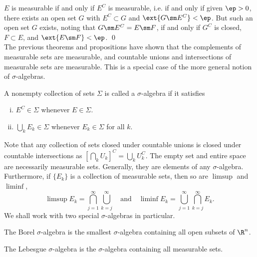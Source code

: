 \pf $E$ is measurable if and only if $E^C$ is measurable, i.e. if and only if given $\ep>0$, there exists an open set $G$ with $E^C \subset G$ and $\ext{G \sm E^C}<\ep$. But such an open set $G$ exists, noting that $G \sm E^C=E \sm F$, if and only if $G^C$ is closed, $F \subset E$, and $\ext{E \sm F}<\ep$. \qed \\










The previous theorems and propositions have shown that the complements of measurable sets are measurable, and countable unions and intersections of measurable sets are measurable. This is a special case of the more general notion of $\sigma$-algebras. 

\begin{dfn}
A nonempty collection of sets $\Sigma$ is called a $\sigma$-algebra if it satisfies
	\begin{enumerate}[(i)]
	\item $E^C \in \Sigma$ whenever $E \in \Sigma$.
	\item $\bigcup_k E_k \in \Sigma$ whenever $E_k \in \Sigma$ for all $k$. 
	\end{enumerate}
\end{dfn}


Note that any collection of sets closed under countable unions is closed under countable intersections as $\left[\bigcap_k U_k \right]^C= \bigcup_k U_k^C$. The empty set and entire space are necessarily measurable sets. Generally, they are elements of any $\sigma$-algebra. Furthermore, if $\{E_k\}$ is a collection of measurable sets, then so are $\limsup$ and $\liminf$,
	\[
	\limsup E_k= \bigcap_{j=1}^\infty \bigcup_{k=j}^\infty \quad\text{and}\quad \liminf E_k= \bigcup_{j=1}^\infty \bigcap_{k=j}^\infty E_k.
	\]
We shall work with two special $\sigma$-algebras in particular.


\begin{dfn}
The Borel $\sigma$-algebra is the smallest $\sigma$-algebra containing all open subsets of $\R^n$. 
\end{dfn}


\begin{dfn}
The Lebesgue $\sigma$-algebra is the $\sigma$-algebra containing all measurable sets. 
\end{dfn}

